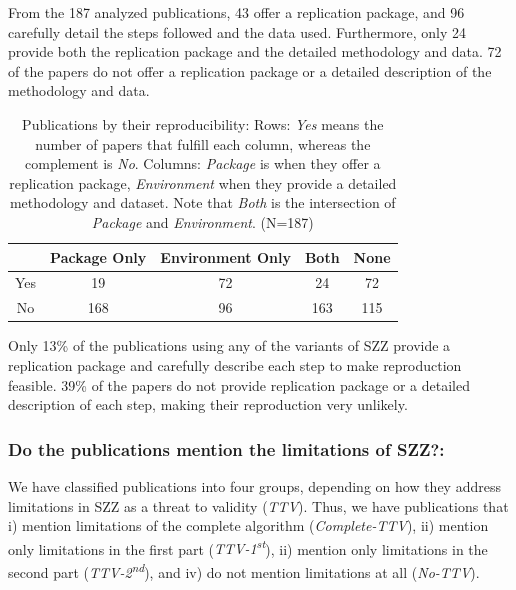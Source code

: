 \documentclass[a4paper, 12pt]{book}
\begin{document}
From the 187 analyzed publications, 43 offer a replication package, and 96 carefully detail the steps followed and the data used. Furthermore, only 24 provide both the replication package and the detailed methodology and data. 72 of the papers do not offer a replication package or a detailed description of the methodology and data.

\begin{table}[!t]
\renewcommand{\arraystretch}{0.8}
\caption{Publications by their reproducibility: Rows: \emph{Yes} means the number of papers that fulfill each column, whereas the complement is \emph{No}. Columns: \emph{Package} is when they offer a replication package, \emph{Environment} when they provide a detailed methodology and dataset. Note that \emph{Both} is the intersection of \emph{Package} and \emph{Environment}. (N=187)}
\label{tableReplication}
\centering
\begin{tabular}{|c|c|c|c|c|}
\hline
    & Package Only & Environment Only & Both & None \\
\hline
\hline
Yes & 19 & 72 & 24 & 72 \\
\hline
No & 168 & 96 & 163 & 115 \\
\hline
\end{tabular}
\end{table}

Only 13\% of the publications using any of the variants of SZZ provide a replication package and carefully describe each step to make reproduction feasible. 39\% of the papers do not provide replication package or a detailed description of each step, making their reproduction very unlikely.

\subsubsection{Do the publications mention the limitations of SZZ?:}
We have classified publications into four groups, depending on how they address limitations in SZZ as a threat to validity (\emph{TTV}). Thus, we have publications that i) mention limitations of the complete algorithm (\emph{Complete-TTV}), ii) mention only limitations in the first part (\emph{TTV-1\textsuperscript{st}}), ii) mention only limitations in the second part (\emph{TTV-2\textsuperscript{nd}}), and iv) do not mention limitations at all (\emph{No-TTV}).
\end{document}
